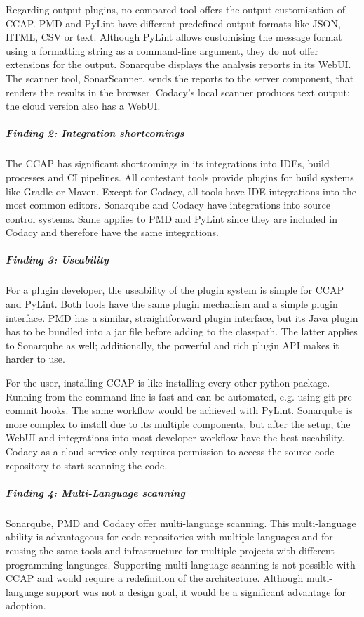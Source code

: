 Regarding output plugins, no compared tool offers the output customisation of CCAP. PMD and PyLint have different predefined output formats like JSON, HTML, CSV or text. Although PyLint allows customising the message format using a formatting string as a command-line argument, they do not offer extensions for the output. Sonarqube displays the analysis reports in its WebUI. The scanner tool, SonarScanner, sends the reports to the server component, that renders the results in the browser. Codacy's local scanner produces text output; the cloud version also has a WebUI.

\subparagraph{Finding 2: Integration shortcomings}
The CCAP has significant shortcomings in its integrations into IDEs, build processes and CI pipelines. All contestant tools provide plugins for build systems like Gradle or Maven. Except for Codacy, all tools have IDE integrations into the most common editors. Sonarqube and Codacy have integrations into source control systems. Same applies to PMD and PyLint since they are included in Codacy and therefore have the same integrations.

\subparagraph{Finding 3: Useability}
For a plugin developer, the useability of the plugin system is simple for CCAP and PyLint. Both tools have the same plugin mechanism and a simple plugin interface. PMD has a similar, straightforward plugin interface, but its Java plugin has to be bundled into a jar file before adding to the classpath. The latter applies to Sonarqube as well; additionally, the powerful and rich plugin API makes it harder to use.

For the user, installing CCAP is like installing every other python package. Running from the command-line is fast and can be automated, e.g. using git pre-commit hooks. The same workflow would be achieved with PyLint. Sonarqube is more complex to install due to its multiple components, but after the setup, the WebUI and integrations into most developer workflow have the best useability. Codacy as a cloud service only requires permission to access the source code repository to start scanning the code.

\subparagraph{Finding 4: Multi-Language scanning}
Sonarqube, PMD and Codacy offer multi-language scanning. This multi-language ability is advantageous for code repositories with multiple languages and for reusing the same tools and infrastructure for multiple projects with different programming languages. Supporting multi-language scanning is not possible with CCAP and would require a redefinition of the architecture. Although multi-language support was not a design goal, it would be a significant advantage for adoption.

